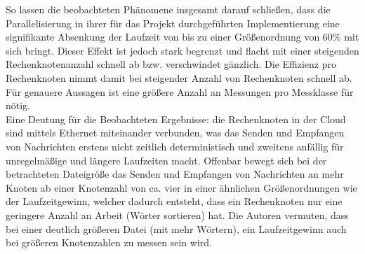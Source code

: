 So lassen die beobachteten Phänomene insgesamt darauf schließen, dass die Parallelisierung in ihrer für das Projekt durchgeführten Implementierung eine signifikante Absenkung der Laufzeit von bis zu einer Größenordnung von 60\% mit sich bringt. Dieser Effekt ist jedoch stark begrenzt und flacht mit einer steigenden Rechenknotenanzahl schnell ab bzw. verschwindet gänzlich. Die Effizienz pro Rechenknoten nimmt damit bei steigender Anzahl von Rechenknoten schnell ab.
Für genauere Aussagen ist eine größere Anzahl an Messungen pro Messklasse für nötig.
\\
Eine Deutung für die Beobachteten Ergebnisse: die Rechenknoten in der Cloud sind mittels Ethernet miteinander verbunden, was das Senden und Empfangen von Nachrichten erstens nicht zeitlich deterministisch und zweitens anfällig für unregelmäßige und längere Laufzeiten macht. Offenbar bewegt sich bei der betrachteten Dateigröße das Senden und Empfangen von Nachrichten an mehr Knoten ab einer Knotenzahl von ca. vier in einer ähnlichen Größenordnungen wie der Laufzeitgewinn, welcher dadurch entsteht, dass ein Rechenknoten nur eine geringere Anzahl an Arbeit (Wörter sortieren) hat. Die Autoren vermuten, dass bei einer deutlich größeren Datei (mit mehr Wörtern), ein Laufzeitgewinn auch bei größeren Knotenzahlen zu messen sein wird.
\\
